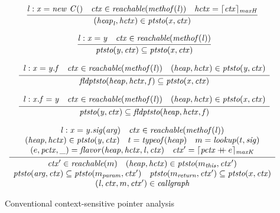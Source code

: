 \begin{figure}[t]
  \[
    \begin{array}{c}

      \infer[]{
      (\heap_\invo, \hctx) \in \VarPointsTo({\var}, {\ctx})
      }{ {\it \invo: x = new~C()} \quad \ctx \in \Reachable({\methof(\invo)}) \quad
      { \hctx = \truncateCtx{\ctx}{\HeapDepth}}} \\[1em]


      \infer{\VarPointsTo({\fromvar}, {\ctx}) \subseteq \VarPointsTo({\tovar}, {\ctx}) }{
      \invo: {\it x = y} \quad
      \ctx \in \Reachable(\methof(\invo)) } \\[1em]

      \infer{
      \FldPointsTo(\heap, \hctx,{\fld}) \subseteq \VarPointsTo({\tovar}, {\ctx})}{
      \begin{array}{c}
        \invo:  {\it x = y.\fld} \quad \ctx \in
        \Reachable(\methof(\invo)) \quad (\heap, \hctx) \in
        \VarPointsTo({{\it y}}, {\ctx})
      \end{array}
      } \\[1em]

      \infer{
      \VarPointsTo({\it y}, {\ctx}) \subseteq \FldPointsTo(\heap, {\hctx}, {\fld})
      }{
      \begin{array}{c}
        {\it \invo: x.f = y} \quad \ctx \in \Reachable(\methof(\invo))
        \quad
        ({\heap}, {\hctx}) \in \VarPointsTo({\it x}, {\ctx})
      \end{array}
      } \\[1em]

      \infer[]
      {
      \begin{array}{c}
        \ctx' \in \Reachable ({m}) \quad
        ({\heap}, {\hctx}) \in  \VarPointsTo ({m_{\this}}, {\ctx'}) \\
        \VarPointsTo({\it arg}, \ctx) \subseteq \VarPointsTo(m_{\it param}, \ctx')
        \quad
        \VarPointsTo(m_{\it return}, \ctx') \subseteq \VarPointsTo(x, \ctx)\\
      (\invo, \ctx, m, \ctx') \in \CallGraph
      \end{array}
      }{
      \begin{array}{c}
       {\it \invo : x = y.{\sig}}({\it arg})
        \quad
        \ctx \in    \Reachable ({\methof(\invo)}) \\
        ({\heap}, {\hctx})\in  \VarPointsTo ({\it y},\ctx) \quad
        t = {\typeof}(\heap)  \quad m = {\lookup}(t, \sig) \\
(e, {\pctx}, \_) = \parent(\heap,\hctx, \invo, \ctx) \quad
        \ctx' = \truncateCtx{\appendCtx{{ \pctx}}{{e}}}{\CallDepth}
      \end{array}
      }
    \end{array}
  \]
  \caption{Conventional context-sensitive pointer analysis}
  \label{pre:baseline-rules}
\end{figure}


